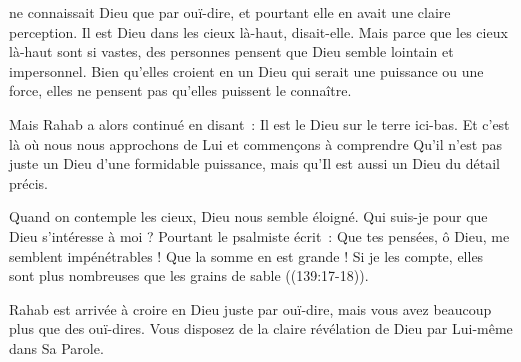 




 ne connaissait Dieu que par ouï-dire,
 et pourtant elle en avait une claire perception.
 \og Il est Dieu dans les cieux là-haut, \fg{} disait-elle.
 Mais parce que les cieux là-haut sont si vastes,
 des personnes pensent que Dieu semble lointain et impersonnel.
 Bien qu'elles croient en un Dieu qui serait une puissance ou une force,
 elles ne pensent pas qu'elles puissent le connaître.

Mais Rahab a alors continué en disant~:
 \og Il est le Dieu sur le terre ici-bas. \fg{}
 Et c'est là où nous nous approchons de Lui
 et commençons à comprendre Qu'il n'est pas juste un Dieu
 d'une formidable puissance, mais qu'Il est aussi un Dieu du détail précis.

Quand on contemple les cieux, Dieu nous semble éloigné.
 Qui suis-je pour que Dieu s'intéresse à moi ?
 Pourtant le psalmiste écrit~:
 \og Que tes pensées, ô Dieu, me semblent impénétrables !
 Que la somme en est grande ! Si je les compte, elles sont plus nombreuses
 que les grains de sable \fg{} ((139:17-18)).


Rahab est arrivée à croire en Dieu juste par ouï-dire,
 mais vous avez beaucoup plus que des ouï-dires.
 Vous disposez de la claire révélation de Dieu par Lui-même dans Sa Parole.

\dvrule




